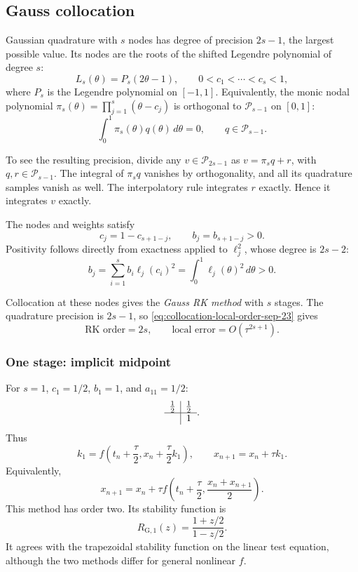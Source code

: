 \subsection{Gauss collocation}

Gaussian quadrature with \(s\) nodes has degree of precision
\(2s-1\), the largest possible value. Its nodes are the roots of the
shifted Legendre polynomial of degree \(s\):
\[
 L_s(\theta)=P_s(2\theta-1),\qquad 0< c_1<\cdots<c_s<1,
\]
where \(P_s\) is the Legendre polynomial on \([-1,1]\).
Equivalently, the monic nodal polynomial
\(\pi_s(\theta)=\prod_{j=1}^s(\theta-c_j)\) is orthogonal to
\(\mathcal P_{s-1}\) on \([0,1]\):
\[
 \int_0^1\pi_s(\theta)q(\theta)\,d\theta=0,
 \qquad q\in\mathcal P_{s-1}.
\]

To see the resulting precision, divide any
\(v\in\mathcal P_{2s-1}\) as
\(v=\pi_s q+r\), with \(q,r\in\mathcal P_{s-1}\).
The integral of \(\pi_s q\) vanishes by orthogonality, and all its
quadrature samples vanish as well. The interpolatory rule integrates
\(r\) exactly. Hence it integrates \(v\) exactly.

The nodes and weights satisfy
\begin{equation}\label{eq:gauss-node-properties-sep-23}
 c_j=1-c_{s+1-j},\qquad
 b_j=b_{s+1-j}>0.
\end{equation}
Positivity follows directly from exactness applied to
\(\ell_j^2\), whose degree is \(2s-2\):
\[
 b_j=\sum_{i=1}^s b_i\ell_j(c_i)^2
     =\int_0^1\ell_j(\theta)^2\,d\theta>0.
\]

Collocation at these nodes gives the \emph{Gauss RK method} with
\(s\) stages. The quadrature precision is \(2s-1\), so
\eqref{eq:collocation-local-order-sep-23} gives
\[
 \text{RK order}=2s,
 \qquad \text{local error}=O(\tau^{2s+1}).
\]

\subsubsection{One stage: implicit midpoint}

For \(s=1\), \(c_1=1/2\), \(b_1=1\), and \(a_{11}=1/2\):
\[
 \begin{array}{c|c}\tfrac12&\tfrac12\\ \hline &1\end{array}.
\]
Thus
\[
 k_1=f\left(t_n+\frac\tau2,x_n+\frac\tau2k_1\right),
 \qquad x_{n+1}=x_n+\tau k_1.
\]
Equivalently,
\[
 x_{n+1}=x_n+\tau f\left(t_n+\frac\tau2,
                              \frac{x_n+x_{n+1}}2\right).
\]
This method has order two. Its stability function is
\[
 R_{\mathrm{G},1}(z)=\frac{1+z/2}{1-z/2}.
\]
It agrees with the trapezoidal stability function on the linear test
equation, although the two methods differ for general nonlinear \(f\).

